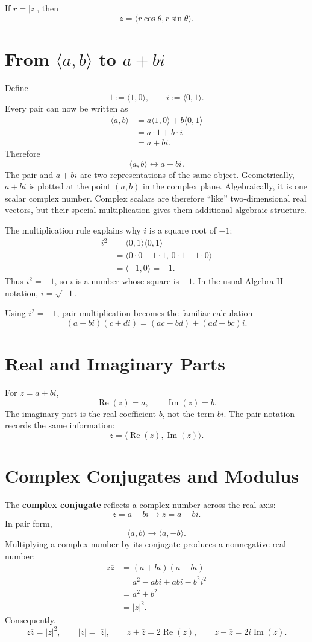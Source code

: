 \documentclass[12pt]{article}
\begin{document}
If $r=|z|$, then
\[
  z=\langle r\cos\theta,r\sin\theta\rangle.
\]

\section*{From $\langle a,b\rangle$ to $a+bi$}
Define
\[
  1:=\langle1,0\rangle,
  \qquad
  i:=\langle0,1\rangle.
\]
Every pair can now be written as
\[
\begin{aligned}
  \langle a,b\rangle
  &=a\langle1,0\rangle+b\langle0,1\rangle\\
  &=a\cdot1+b\cdot i\\
  &=a+bi.
\end{aligned}
\]
Therefore
\[
  \boxed{\langle a,b\rangle\longleftrightarrow a+bi.}
\]
The pair and $a+bi$ are two representations of the same object. Geometrically, $a+bi$ is plotted at the point $(a,b)$ in the complex plane. Algebraically, it is one scalar complex number. Complex scalars are therefore ``like'' two-dimensional real vectors, but their special multiplication gives them additional algebraic structure.

The multiplication rule explains why $i$ is a square root of $-1$:
\[
\begin{aligned}
  i^2
  &=\langle0,1\rangle\langle0,1\rangle\\
  &=\langle0\cdot0-1\cdot1,\,0\cdot1+1\cdot0\rangle\\
  &=\langle-1,0\rangle=-1.
\end{aligned}
\]
Thus $i^2=-1$, so $i$ is a number whose square is $-1$. In the usual Algebra II notation, $i=\sqrt{-1}$.

Using $i^2=-1$, pair multiplication becomes the familiar calculation
\[
  (a+bi)(c+di)=(ac-bd)+(ad+bc)i.
\]

\section*{Real and Imaginary Parts}
For $z=a+bi$,
\[
  \operatorname{Re}(z)=a,
  \qquad
  \operatorname{Im}(z)=b.
\]
The imaginary part is the real coefficient $b$, not the term $bi$. The pair notation records the same information:
\[
  z=\langle\operatorname{Re}(z),\operatorname{Im}(z)\rangle.
\]

\section*{Complex Conjugates and Modulus}
The \textbf{complex conjugate} reflects a complex number across the real axis:
\[
  z=a+bi\longrightarrow\overline z=a-bi.
\]
In pair form,
\[
  \langle a,b\rangle\longrightarrow\langle a,-b\rangle.
\]
Multiplying a complex number by its conjugate produces a nonnegative real number:
\[
\begin{aligned}
  z\overline z
  &=(a+bi)(a-bi)\\
  &=a^2-abi+abi-b^2i^2\\
  &=a^2+b^2\\
  &=|z|^2.
\end{aligned}
\]
Consequently,
\[
  \boxed{z\overline z=|z|^2},
  \qquad
  |z|=|\overline z|,
  \qquad
  z+\overline z=2\operatorname{Re}(z),
  \qquad
  z-\overline z=2i\operatorname{Im}(z).
\]
\end{document}
